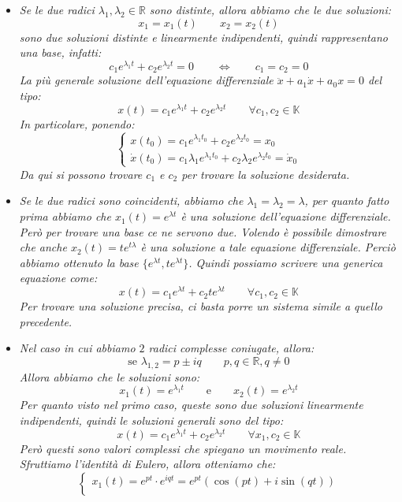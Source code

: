 \documentclass[11pt,a4paper,twoside]{article}
\theoremstyle{definition}
\begin{document}
\begin{itemize}
	\item \textit{Se le due radici $\lambda_1, \lambda_2 \in \mathbb R$ sono distinte, allora abbiamo che le due soluzioni:
		\[ x_1 = x_1(t)\qquad x_2 = x_2(t) \]
		sono due soluzioni distinte e linearmente indipendenti, quindi rappresentano una base, infatti:
		\[ c_1e^{\lambda_1t} + c_2 e^{\lambda_2t} = 0\qquad \Leftrightarrow \qquad c_1 = c_2 = 0 \]
		La più generale soluzione dell'equazione differenziale $\ddot x + a_1 \dot x + a_0x =0$ del tipo:}
		\[ x(t) = c_1e^{\lambda_1t} + c_2 e^{\lambda_2t} \qquad \forall c_1,c_2 \in \mathbb K \]
		\textit{In particolare, ponendo:}
		\[
			\begin{cases}
				x(t_0) = c_1 e^{\lambda_1 t_0} + c_2 e^{\lambda_2 t_0} = x_0\\
				\dot x(t_0) = c_1 \lambda_1 e^{\lambda_1 t_0} + c_2 \lambda_2 e^{\lambda_2 t_0} = \dot x_0
			\end{cases}
		\]
		\textit{Da qui si possono trovare $c_1$ e $c_2$ per trovare la soluzione desiderata.}
	\item \textit{Se le due radici sono coincidenti, abbiamo che $\lambda_1 = \lambda_2 = \lambda$, per quanto fatto prima abbiamo che $x_1(t) = e^{\lambda t}$ è una soluzione dell'equazione differenziale. Però per trovare una base ce ne servono due. Volendo è possibile dimostrare che anche $x_2(t) = te^{t \lambda}$ è una soluzione a tale equazione differenziale. Perciò abbiamo ottenuto la base $\{e^{\lambda t}, te^{\lambda t}\}$. Quindi possiamo scrivere una generica equazione come:
		\[ x(t) = c_1e^{\lambda t} + c_2t e^{\lambda t}\qquad \forall c_1,c_2 \in \mathbb K \]
		Per trovare una soluzione precisa, ci basta porre un sistema simile a quello precedente.}
	\item \textit{Nel caso in cui abbiamo $2$ radici complesse coniugate, allora:
		\[ \text{se }\lambda_{1,2} = p \pm iq \qquad p,q \in \mathbb R, q \neq 0\]
		Allora abbiamo che le soluzioni sono:
		\[ x_1(t) = e^{\lambda_1t} \qquad \text{e} \qquad x_2(t) = e^{\lambda_2t} \]
		Per quanto visto nel primo caso, queste sono due soluzioni linearmente indipendenti, quindi le soluzioni generali sono del tipo:
		\[ x(t) = c_1e^{\lambda_1 t} + c_2 e^{\lambda_2 t} \qquad \forall x_1,c_2 \in \mathbb K\]
		Però questi sono valori complessi che spiegano un movimento reale. Sfruttiamo l'identità di Eulero, allora otteniamo che:
		\[ \begin{cases}
			x_1(t) = e^{pt} \cdot e^{iqt} = e^{pt}(\cos(pt) + i \sin(qt))\\

\end{cases}\]}
\end{itemize}
\end{document}
